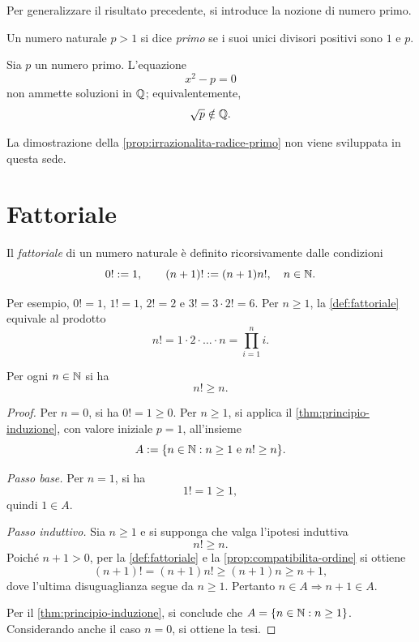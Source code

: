 \clearpage

Per generalizzare il risultato precedente, si introduce
la nozione di numero primo.

\begin{definition}
\label{def:numero-primo}
Un numero naturale \(p>1\) si dice \emph{primo} se i suoi unici
divisori positivi sono \(1\) e \(p\).
\end{definition}

\begin{proposition}
\label{prop:irrazionalita-radice-primo}
Sia \(p\) un numero primo. L'equazione
\[
  x^2-p=0
\]
non ammette soluzioni in \(\mathbb{Q}\); equivalentemente,
\[
  \sqrt{p}\notin\mathbb{Q}.
\]
\end{proposition}

La dimostrazione della \cref{prop:irrazionalita-radice-primo} non viene
sviluppata in questa sede.

\section{Fattoriale}
\label{sec:lez02-fattoriale}

\begin{definition}[Fattoriale]
\label{def:fattoriale}
Il \emph{fattoriale} di un numero naturale è definito ricorsivamente
dalle condizioni
\[
  0!:=1,
  \qquad
  (n+1)!:=(n+1)n!,
  \quad n\in\mathbb{N}.
\]
\end{definition}

Per esempio, \(0!=1\), \(1!=1\), \(2!=2\) e
\(3!=3\cdot2!=6\). Per \(n\ge1\), la \cref{def:fattoriale}
equivale al prodotto
\[
  n!=1\cdot2\cdot\ldots\cdot n=\prod_{i=1}^{n}i.
\]

\begin{proposition}
\label{prop:fattoriale-maggiore-n}
Per ogni \(n\in\mathbb{N}\) si ha
\[
  n!\ge n.
\]
\end{proposition}

\begin{proof}
Per \(n=0\), si ha \(0!=1\ge0\). Per \(n\ge1\), si applica
il \cref{thm:principio-induzione}, con valore iniziale \(p=1\),
all'insieme
\[
  A:=\{n\in\mathbb{N}:n\ge1\text{ e }n!\ge n\}.
\]

\emph{Passo base.}
Per \(n=1\), si ha
\[
  1!=1\ge1,
\]
quindi \(1\in A\).

\emph{Passo induttivo.}
Sia \(n\ge1\) e si supponga che valga l'ipotesi induttiva
\[
  n!\ge n.
\]
Poiché \(n+1>0\), per la \cref{def:fattoriale} e la
\cref{prop:compatibilita-ordine} si ottiene
\[
  (n+1)!=(n+1)n!\ge(n+1)n\ge n+1,
\]
dove l'ultima disuguaglianza segue da \(n\ge1\).
Pertanto \(n\in A\Longrightarrow n+1\in A\).

Per il \cref{thm:principio-induzione}, si conclude che
\(A=\{n\in\mathbb{N}:n\ge1\}\). Considerando anche il caso
\(n=0\), si ottiene la tesi.
\end{proof}
